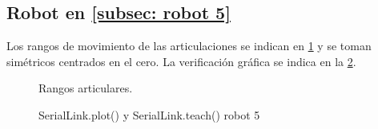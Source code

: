 \documentclass[a4paper,12pt]{article}
\begin{document}
\subsection{Robot en \cref{subsec: robot 5}}
Los rangos de movimiento de las articulaciones se indican en \cref{rangos fanuc}
y se toman simétricos centrados en el cero. La
verificación gráfica se indica en la \cref{teach robot 5}.

\begin{figure}[htpb]
    \centering
    \begin{adjustbox}{scale = 0.7, max width=\columnwidth}
    \end{adjustbox}
    \caption{Rangos articulares.}
    \label{rangos fanuc}
\end{figure}

\begin{figure}[htpb]
    \centering
    \begin{adjustbox}{max width=\columnwidth}
    \end{adjustbox}
    \caption{SerialLink.plot() y SerialLink.teach() robot 5}
    \label{teach robot 5}
\end{figure}
\end{document}
